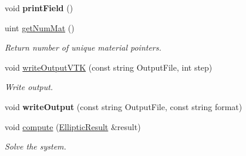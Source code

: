 \begin{DoxyCompactItemize}
\item 
\hypertarget{classvoom_1_1_poisson_model_a7dd4fb8adfc12949dcd58cdff1e719c8}{
void {\bfseries printField} ()}
\label{classvoom_1_1_poisson_model_a7dd4fb8adfc12949dcd58cdff1e719c8}

\item 
\hypertarget{classvoom_1_1_poisson_model_aec86d71b58935c094633a624f88db0b3}{
uint \hyperlink{classvoom_1_1_poisson_model_aec86d71b58935c094633a624f88db0b3}{getNumMat} ()}
\label{classvoom_1_1_poisson_model_aec86d71b58935c094633a624f88db0b3}

\begin{DoxyCompactList}\small\item\em Return number of unique material pointers. \item\end{DoxyCompactList}\item 
\hypertarget{classvoom_1_1_poisson_model_ae9eb61d294ec2a4df697f40e4395d2e9}{
void \hyperlink{classvoom_1_1_poisson_model_ae9eb61d294ec2a4df697f40e4395d2e9}{writeOutputVTK} (const string OutputFile, int step)}
\label{classvoom_1_1_poisson_model_ae9eb61d294ec2a4df697f40e4395d2e9}

\begin{DoxyCompactList}\small\item\em Write output. \item\end{DoxyCompactList}\item 
\hypertarget{classvoom_1_1_poisson_model_a3fec9c7ffa0019db13f26f819d3c503e}{
void {\bfseries writeOutput} (const string OutputFile, const string format)}
\label{classvoom_1_1_poisson_model_a3fec9c7ffa0019db13f26f819d3c503e}

\item 
\hypertarget{classvoom_1_1_poisson_model_abebe125119aedfef8e067e1ef35dae57}{
void \hyperlink{classvoom_1_1_poisson_model_abebe125119aedfef8e067e1ef35dae57}{compute} (\hyperlink{structvoom_1_1_elliptic_result}{EllipticResult} \&result)}
\label{classvoom_1_1_poisson_model_abebe125119aedfef8e067e1ef35dae57}

\begin{DoxyCompactList}\small\item\em Solve the system. \item\end{DoxyCompactList}\end{DoxyCompactItemize}
